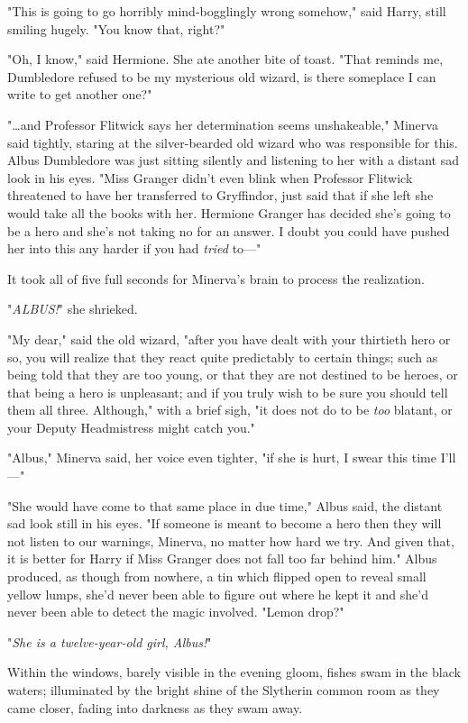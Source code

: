 "This is going to go horribly mind-bogglingly wrong somehow," said Harry, still
smiling hugely. "You know that, right?"

"Oh, I know," said Hermione. She ate another bite of toast. "That reminds me,
Dumbledore refused to be my mysterious old wizard, is there someplace I can
write to get another one?"

"{\ldots}and Professor Flitwick says her determination seems unshakeable,"
Minerva said tightly, staring at the silver-bearded old wizard who was
responsible for this. Albus Dumbledore was just sitting silently and listening
to her with a distant sad look in his eyes. "Miss Granger didn't even blink
when Professor Flitwick threatened to have her transferred to Gryffindor, just
said that if she left she would take all the books with her. Hermione Granger
has decided she's going to be a hero and she's not taking no for an answer. I
doubt you could have pushed her into this any harder if you had \emph{tried}
to---"

It took all of five full seconds for Minerva's brain to process the realization.

"\emph{ALBUS!}" she shrieked.

"My dear," said the old wizard, "after you have dealt with your thirtieth hero
or so, you will realize that they react quite predictably to certain things;
such as being told that they are too young, or that they are not destined to be
heroes, or that being a hero is unpleasant; and if you truly wish to be sure
you should tell them all three. Although," with a brief sigh, "it does not do
to be \emph{too} blatant, or your Deputy Headmistress might catch you."

"Albus," Minerva said, her voice even tighter, "if she is hurt, I swear this
time I'll---"

"She would have come to that same place in due time," Albus said, the distant
sad look still in his eyes. "If someone is meant to become a hero then they
will not listen to our warnings, Minerva, no matter how hard we try. And given
that, it is better for Harry if Miss Granger does not fall too far behind him."
Albus produced, as though from nowhere, a tin which flipped open to reveal
small yellow lumps, she'd never been able to figure out where he kept it and
she'd never been able to detect the magic involved. "Lemon drop?"

"\emph{She is a twelve-year-old girl, Albus!}"

Within the windows, barely visible in the evening gloom, fishes swam in the
black waters; illuminated by the bright shine of the Slytherin common room as
they came closer, fading into darkness as they swam away.

